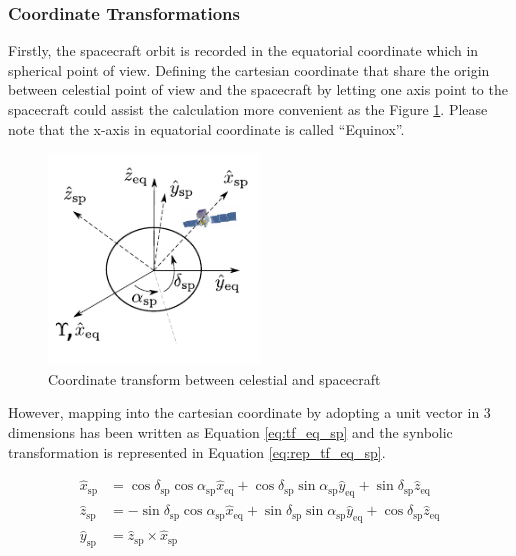 \subsubsection{Coordinate Transformations}

Firstly, the spacecraft orbit is recorded in the equatorial coordinate
which in spherical point of view. Defining the cartesian coordinate
that share the origin between celestial point of view and the spacecraft 
by letting one axis point to the spacecraft could assist the calculation
more convenient as the Figure \ref{fig:coord_eq_sp}. Please note that 
the x-axis in equatorial coordinate is called ``Equinox''.

\begin{figure}[h!]
    \centering
    \includegraphics[width=0.5\textwidth]{content/methodology/figures/coord_eq_sp.pdf}
    \caption{Coordinate transform between celestial and spacecraft}
    \label{fig:coord_eq_sp}
\end{figure}


However, mapping into the cartesian 
coordinate by adopting a unit vector in 3 dimensions has been written
as Equation \ref{eq:tf_eq_sp} and the synbolic transformation is 
represented in Equation \ref{eq:rep_tf_eq_sp}.

\begin{equation}
    \begin{split}
    \hat{x}_\text{sp} &= \cos\delta_\text{sp}\cos\alpha_\text{sp}\hat{x}_\text{eq} + \cos\delta_\text{sp}\sin\alpha_\text{sp}\hat{y}_\text{eq} + \sin\delta_\text{sp}\hat{z}_\text{eq}\\
    \hat{z}_\text{sp} &= - \sin\delta_\text{sp}\cos\alpha_\text{sp}\hat{x}_\text{eq} + \sin\delta_\text{sp}\sin\alpha_\text{sp}\hat{y}_\text{eq} + \cos\delta_\text{sp}\hat{z}_\text{eq} \\
    \hat{y}_\text{sp} &= \hat{z}_\text{sp} \times \hat{x}_\text{sp}
    \end{split}
    \label{eq:tf_eq_sp}
\end{equation}

